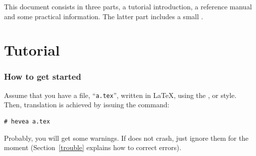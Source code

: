 \begin{abstract}
\hevea{} is a \LaTeX{} to
\html{} translator.
The input language is a fairly complete subset of \LaTeXe{} (old
\LaTeX{} style is also accepted) and the
output language is {\html} that is (hopefully) correct with respect to
version 4.0 transitional.

Recent versions of most browsers offer support for Unicode (ISO~10646)
characters, albeit to different extents. \hevea{} exploits this fact
to translate various math symbols used in \LaTeX. As a result, almost
the entire set of math symbols, including the {\tt amssymb} ones, are
correctly rendered. The use of the symbol font browsers is no longer
the default.

\hevea{} understands \LaTeX{} macro definitions. Simple user style
files are understood with little or no modifications.
Furthermore, \hevea{} customization is done by writing \LaTeX{} code.


\hevea{} is written in Objective Caml, as many lexers. It is
quite fast and flexible.  Using \hevea{} it is possible to translate
large documents such as manuals, books, etc. very quickly. All
documents are translated as one single {\html} file. Then, the output
file can be cut into smaller files, using the companion program~\hacha.

\hevea{} can also be instructed to output plain text or info files.

Information on \hevea{} is available at \ahrefurl{\heveaurl}.
\end{abstract}

\clearpage
{}
\tableofcontents
\cutend

\begin{htmlonly}
This document consists in three parts, a tutorial introduction, a
reference manual and some practical information. The latter part
includes a small .
\end{htmlonly}

\clearpage
\part{Tutorial}
\label{usermanual}
\section{How to get started}\label{getstarted}
Assume that you have a file, ``\texttt{a.tex}'', written in \LaTeX, using the
,  or  style. Then,
translation
is achieved by issuing the command:
\begin{verbatim}
# hevea a.tex
\end{verbatim}
Probably, you will get some warnings. If
\hevea{} does not crash, just ignore them for the moment
(Section~\ref{trouble}  explains how to correct errors).

